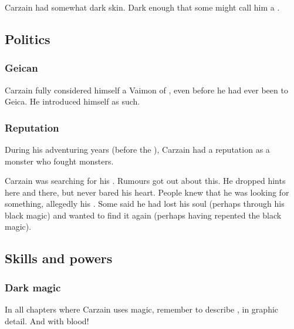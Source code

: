 \subsubsection{\Demihuman}
Carzain had somewhat dark skin. 
Dark enough that some might call him a \demihuman.








\subsection{Politics}





\subsubsection{Geican}
Carzain fully considered himself a Vaimon of \ClanGeican, even before he had ever been to Geica.
He introduced himself as such. 





\subsubsection{Reputation}
During his adventuring years (before the ), Carzain had a reputation as a monster who fought monsters. 

Carzain was searching for his .
Rumours got out about this. 
He dropped hints here and there, but never bared his heart. 
People knew that he was looking for something, allegedly his . 
Some said he had lost his soul (perhaps through his black magic) and wanted to find it again (perhaps having repented the black magic). 









\subsection{Skills and powers}





\subsubsection{Dark magic}
In all chapters where Carzain uses magic, remember to describe , in graphic detail. 
And with blood! 


